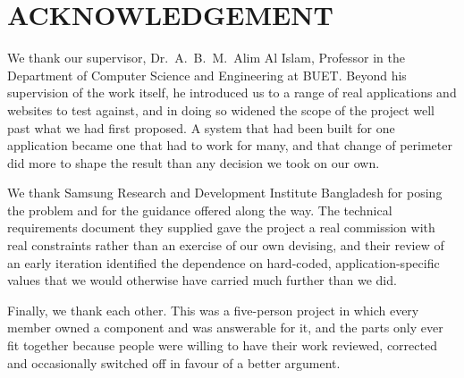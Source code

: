 \chapter*{ACKNOWLEDGEMENT}

We thank our supervisor, Dr.\ A.\ B.\ M.\ Alim Al Islam, Professor in the
Department of Computer Science and Engineering at BUET. Beyond his supervision
of the work itself, he introduced us to a range of real applications and
websites to test against, and in doing so widened the scope of the project well
past what we had first proposed. A system that had been built for one
application became one that had to work for many, and that change of perimeter
did more to shape the result than any decision we took on our own.

We thank Samsung Research and Development Institute Bangladesh for posing the
problem and for the guidance offered along the way. The technical requirements
document they supplied gave the project a real commission with real
constraints rather than an exercise of our own devising, and their review of an
early iteration identified the dependence on hard-coded, application-specific
values that we would otherwise have carried much further than we did.

Finally, we thank each other. This was a five-person project in which every
member owned a component and was answerable for it, and the parts only ever fit
together because people were willing to have their work reviewed, corrected and
occasionally switched off in favour of a better argument.
\clearpage
